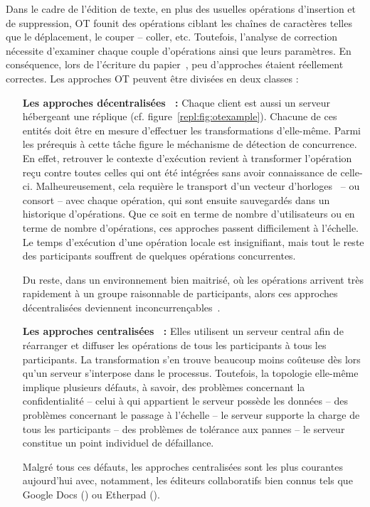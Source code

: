 Dans le cadre de l'édition de texte, en plus des usuelles opérations d'insertion
et de suppression, OT founit des opérations ciblant les chaînes de caractères
telles que le déplacement, le couper -- coller, etc. Toutefois, l'analyse de
correction nécessite d'examiner chaque couple d'opérations ainsi que leurs
paramètres. En conséquence, lors de l'écriture du
papier~\cite{imine2003proving}, peu d'approches étaient réellement correctes.
Les approches OT peuvent être divisées en deux classes :
\begin{itemize}
\item [\textbf{Les approches décentralisées~\cite{sun2009contextbased} :}]
  Chaque client est aussi un serveur hébergeant une réplique
  (cf. figure~\ref{repl:fig:otexample}). Chacune de ces entités doit être en
  mesure d'effectuer les transformations d'elle-même. Parmi les prérequis à
  cette tâche figure le méchanisme de détection de concurrence. En effet,
  retrouver le contexte d'exécution revient à transformer l'opération reçu
  contre toutes celles qui ont été intégrées sans avoir connaissance de
  celle-ci. Malheureusement, cela requière le transport d'un vecteur
  d'horloges~\cite{lamport1978time} -- ou consort -- avec chaque opération, qui
  sont ensuite sauvegardés dans un historique d'opérations. Que ce soit en terme
  de nombre d'utilisateurs ou en terme de nombre d'opérations, ces approches
  passent difficilement à l'échelle. Le temps d'exécution d'une opération locale
  est insignifiant, mais tout le reste des participants souffrent de quelques
  opérations concurrentes.

  Du reste, dans un environnement bien maitrisé, où les opérations arrivent très
  rapidement à un groupe raisonnable de participants, alors ces approches
  décentralisées deviennent inconcurrençables~\cite{mehdi2014merging}.
\item [\textbf{Les approches centralisées~\cite{nichols1995high} :}] Elles
  utilisent un serveur central afin de réarranger et diffuser les opérations de
  tous les participants à tous les participants. La transformation s'en trouve
  beaucoup moins coûteuse dès lors qu'un serveur s'interpose dans le
  processus. Toutefois, la topologie elle-même implique plusieurs défauts, à
  savoir, des problèmes concernant la confidentialité -- celui à qui appartient
  le serveur possède les données -- des problèmes concernant le passage à
  l'échelle -- le serveur supporte la charge de tous les participants -- des
  problèmes de tolérance aux pannes -- le serveur constitue un point individuel
  de défaillance.

  Malgré tous ces défauts, les approches centralisées sont les plus courantes
  aujourd'hui avec, notamment, les éditeurs collaboratifs bien connus tels que
  Google Docs (\REF) ou Etherpad (\REF).
\end{itemize}

